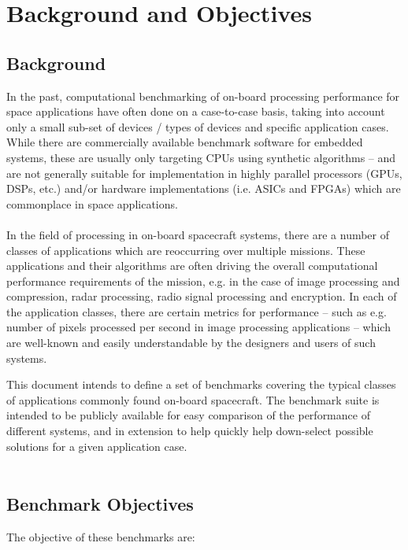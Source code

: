 \chapter{Background and Objectives}
\section{Background}
In the past, computational benchmarking of on-board processing performance for space applications have often done on a case-to-case basis, taking into account only a small sub-set of devices / types of devices and specific application cases. While there are commercially available benchmark software for embedded systems, these are usually only targeting CPUs using synthetic algorithms – and are not generally suitable for implementation in highly parallel processors (GPUs, DSPs, etc.) and/or hardware implementations (i.e. ASICs and FPGAs) which are commonplace in space applications.
\\ \\
In the field of processing in on-board spacecraft systems, there are a number of classes of applications which are reoccurring over multiple missions. These applications and their algorithms are often driving the overall computational performance requirements of the mission, e.g. in the case of image processing and compression, radar processing, radio signal processing and encryption. In each of the application classes, there are certain metrics for performance – such as e.g. number of pixels processed per second in image processing applications – which are well-known and easily understandable by the designers and users of such systems. 

This document intends to define a set of benchmarks covering the typical classes of applications commonly found on-board spacecraft. The benchmark suite is intended to be publicly available for easy comparison of the performance of different systems, and in extension to help quickly help down-select possible solutions for a given application case.
\\ \\


\section{Benchmark Objectives}
The objective of these benchmarks are:

